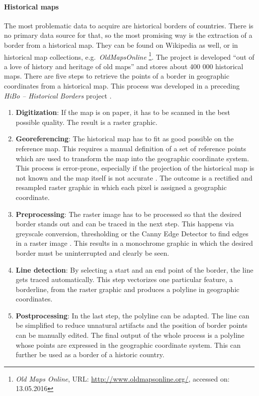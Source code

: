 \paragraph{Historical maps} %
\label{par:historical_map}

The most problematic data to acquire are historical borders of countries. There is no primary data source for that, so the most promising way is the extraction of a border from a historical map. They can be found on Wikipedia as well, or in historical map collections, e.g.\ \emph{OldMapsOnline}
\footnote{
  \textit{Old Maps Online},
  URL: \url{http://www.oldmapsonline.org/},
  accessed on: 13.05.2016
}.
The project is developed ``out of a love of history and heritage of old maps'' and stores about 400 000 historical maps.
There are five steps to retrieve the points of a border in geographic coordinates from a historical map. This process was developed in a preceding \emph{HiBo -- Historical Borders} project \cite{hibo}.

\begin{enumerate}
  \item \textbf{Digitization}: If the map is on paper, it has to be scanned in the best possible quality. The result is a raster graphic.
  \item \textbf{Georeferencing}: The historical map has to fit as good possible on the reference map. This requires a manual definition of a set of reference points which are used to transform the map into the geographic coordinate system. This process is error-prone, especially if the projection of the historical map is not known and the map itself is not accurate
  \cite{knowles2002past}.
  The outcome is a rectified and resampled raster graphic in which each pixel is assigned a geographic coordinate.
  \item \textbf{Preprocessing}: The raster image has to be processed so that the desired border stands out and can be traced in the next step. This happens via greyscale conversion, thresholding or the Canny Edge Detector to find edges in a raster image \cite{canny}. This results in a monochrome graphic in which the desired border must be uninterrupted and clearly be seen.
  \item \textbf{Line detection}: By selecting a start and an end point of the border, the line gets traced automatically. This step vectorizes one particular feature, a borderline, from the raster graphic and produces a polyline in geographic coordinates.
  \item \textbf{Postprocessing}: In the last step, the polyline can be adapted. The line can be simplified to reduce unnatural artifacts and the position of border points can be manually edited. The final output of the whole process is a polyline whose points are expressed in the geographic coordinate system. This can further be used as a border of a historic country.
\end{enumerate}

